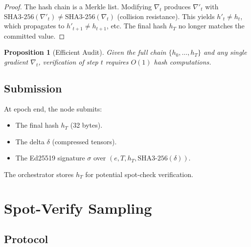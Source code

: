 \documentclass[11pt,letterpaper]{article}
\newtheorem{proposition}[theorem]{Proposition}
\begin{document}
\begin{proof}
The hash chain is a Merkle list.  Modifying $\nabla_t$ produces $\nabla'_t$ with $\text{SHA3-256}(\nabla'_t) \neq \text{SHA3-256}(\nabla_t)$ (collision resistance).  This yields $h'_t \neq h_t$, which propagates to $h'_{t+1} \neq h_{t+1}$, etc.  The final hash $h_T$ no longer matches the committed value.
\end{proof}

\begin{proposition}[Efficient Audit]
Given the full chain $\{h_0, \ldots, h_T\}$ and any single gradient $\nabla_t$, verification of step $t$ requires $O(1)$ hash computations.
\end{proposition}

\subsection{Submission}

At epoch end, the node submits:
\begin{itemize}
    \item The final hash $h_T$ (32 bytes).
    \item The delta $\delta$ (compressed tensors).
    \item The Ed25519 signature $\sigma$ over $(e, T, h_T, \text{SHA3-256}(\delta))$.
\end{itemize}

The orchestrator stores $h_T$ for potential spot-check verification.

\section{Spot-Verify Sampling}
\label{sec:spotcheck}

\subsection{Protocol}
\end{document}

